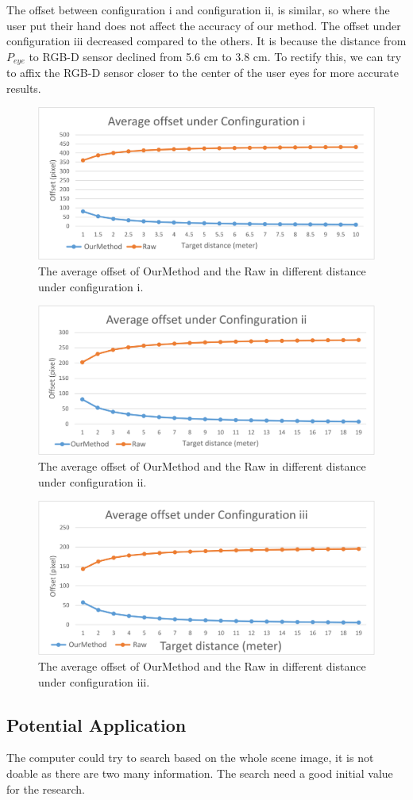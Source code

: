 The offset between configuration i and configuration ii, is similar, so where the user put their hand does not affect the accuracy of our method. The offset under configuration iii decreased compared to the others. It is because the distance from $P_{eye}$ to RGB-D sensor declined from 5.6 cm to 3.8 cm. To rectify this, we can try to affix the RGB-D sensor closer to the center of the user eyes for more accurate results. 
\begin{figure} [h]
	\centering
	\includegraphics[width= \linewidth]{figures/4-UP/simulationResi.png}
	\caption{The average offset of OurMethod and the Raw in different distance under configuration i.}
	\label{fig:4-UP:simulateResi}
\end{figure}
\begin{figure} [h]
	\centering
	\includegraphics[width= \linewidth]{figures/4-UP/simulationResii.png}
	\caption{The average offset of OurMethod and the Raw in different distance under configuration ii.}
	\label{fig:4-UP:simulateResii}
\end{figure}
\begin{figure} [h]
	\centering
	\includegraphics[width= \linewidth]{figures/4-UP/simulationResiii.png}
	\caption{The average offset of OurMethod and the Raw in different distance under configuration iii.}
	\label{fig:4-UP:simulateResiii}
\end{figure}
\subsection{Potential Application}

The computer could try to search based on the whole scene image, it is not doable  as there are two many information. The search need a good initial value for the research.
